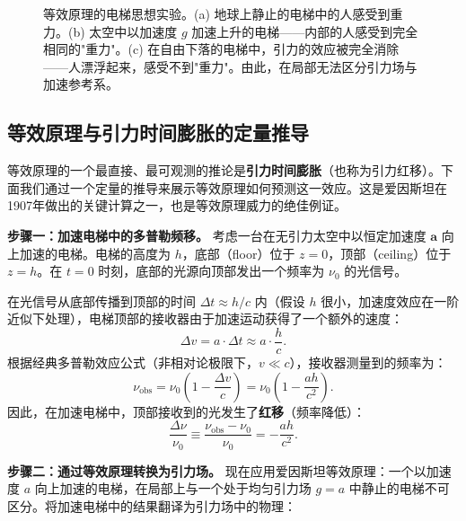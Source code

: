 \begin{figure}[htbp]
\caption{等效原理的电梯思想实验。(a) 地球上静止的电梯中的人感受到重力。(b) 太空中以加速度 $g$ 加速上升的电梯——内部的人感受到完全相同的"重力"。(c) 在自由下落的电梯中，引力的效应被完全消除——人漂浮起来，感受不到"重力"。由此，在局部无法区分引力场与加速参考系。}
\label{fig:elevator_experiment}
\end{figure}

\subsection{等效原理与引力时间膨胀的定量推导}

等效原理的一个最直接、最可观测的推论是\textbf{引力时间膨胀}（也称为引力红移）。下面我们通过一个定量的推导来展示等效原理如何预测这一效应。这是爱因斯坦在1907年做出的关键计算之一，也是等效原理威力的绝佳例证。

\medskip

\noindent\textbf{步骤一：加速电梯中的多普勒频移。} 考虑一台在无引力太空中以恒定加速度 $\mathbf{a}$ 向上加速的电梯。电梯的高度为 $h$，底部（floor）位于 $z=0$，顶部（ceiling）位于 $z=h$。在 $t=0$ 时刻，底部的光源向顶部发出一个频率为 $\nu_0$ 的光信号。

在光信号从底部传播到顶部的时间 $\Delta t \approx h/c$ 内（假设 $h$ 很小，加速度效应在一阶近似下处理），电梯顶部的接收器由于加速运动获得了一个额外的速度：
\begin{equation}
    \Delta v = a \cdot \Delta t \approx a \cdot \frac{h}{c}.
\end{equation}
根据经典多普勒效应公式（非相对论极限下，$v \ll c$），接收器测量到的频率为：
\begin{equation}
    \nu_{\text{obs}} = \nu_0 \left(1 - \frac{\Delta v}{c}\right) = \nu_0 \left(1 - \frac{a h}{c^2}\right).
\end{equation}
因此，在加速电梯中，顶部接收到的光发生了\textbf{红移}（频率降低）：
\begin{equation}
    \frac{\Delta \nu}{\nu_0} \equiv \frac{\nu_{\text{obs}} - \nu_0}{\nu_0} = -\frac{a h}{c^2}.
\end{equation}

\medskip

\noindent\textbf{步骤二：通过等效原理转换为引力场。} 现在应用爱因斯坦等效原理：一个以加速度 $a$ 向上加速的电梯，在局部上与一个处于均匀引力场 $g = a$ 中静止的电梯不可区分。将加速电梯中的结果翻译为引力场中的物理：

